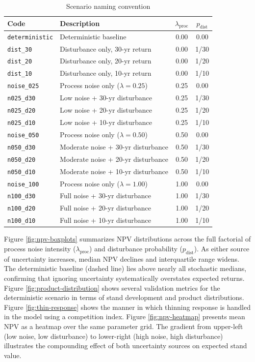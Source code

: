 \documentclass[12pt]{report}
\begin{document}
\begin{table}[htbp]
  \centering
  \caption{Scenario naming convention}
  \label{tab:scenario_codes}
  \begin{tabular}{llcc}
  \toprule
  Code & Description & $\lambda_{\text{proc}}$ & $p_{\text{dist}}$ \\
  \midrule
  \texttt{deterministic} & Deterministic baseline & 0.00 & 0.00 \\
  \texttt{dist\_30} & Disturbance only, 30-yr return & 0.00 & 1/30 \\
  \texttt{dist\_20} & Disturbance only, 20-yr return & 0.00 & 1/20 \\
  \texttt{dist\_10} & Disturbance only, 10-yr return & 0.00 & 1/10 \\
  \texttt{noise\_025} & Process noise only ($\lambda=0.25$) & 0.25 & 0.00 \\
  \texttt{n025\_d30} & Low noise + 30-yr disturbance & 0.25 & 1/30 \\
  \texttt{n025\_d20} & Low noise + 20-yr disturbance & 0.25 & 1/20 \\
  \texttt{n025\_d10} & Low noise + 10-yr disturbance & 0.25 & 1/10 \\
  \texttt{noise\_050} & Process noise only ($\lambda=0.50$) & 0.50 & 0.00 \\
  \texttt{n050\_d30} & Moderate noise + 30-yr disturbance & 0.50 & 1/30 \\
  \texttt{n050\_d20} & Moderate noise + 20-yr disturbance & 0.50 & 1/20 \\
  \texttt{n050\_d10} & Moderate noise + 10-yr disturbance & 0.50 & 1/10 \\
  \texttt{noise\_100} & Process noise only ($\lambda=1.00$) & 1.00 & 0.00 \\
  \texttt{n100\_d30} & Full noise + 30-yr disturbance & 1.00 & 1/30 \\
  \texttt{n100\_d20} & Full noise + 20-yr disturbance & 1.00 & 1/20 \\
  \texttt{n100\_d10} & Full noise + 10-yr disturbance & 1.00 & 1/10 \\
  \bottomrule
  \end{tabular}
\end{table}

Figure \ref{fig:npv-boxplots} summarizes NPV distributions across the full factorial of process noise intensity ($\lambda_{\text{proc}}$) and disturbance probability ($p_{\text{dist}}$). As either source of uncertainty increases, median NPV declines and interquartile range widens. The deterministic baseline (dashed line) lies above nearly all stochastic medians, confirming that ignoring uncertainty systematically overstates expected returns. Figure \ref{fig:product-distribution} shows several validation metrics for the deterministic scenario in terms of stand development and product distributions. Figure \ref{fig:thin-response} shows the manner in which thinning response is handled in the model using a competition index. Figure \ref{fig:npv-heatmap} presents mean NPV as a heatmap over the same parameter grid. The gradient from upper-left (low noise, low disturbance) to lower-right (high noise, high disturbance) illustrates the compounding effect of both uncertainty sources on expected stand value.
\end{document}

